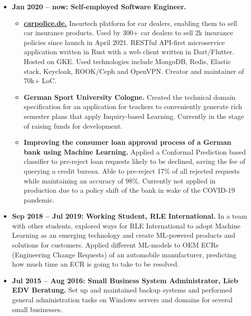 \documentclass[10pt]{article}
\begin{document}
\begin{itemize}[label={}, leftmargin=*]

\item \textbf{Jan 2020 -- now: Self-employed Software Engineer.}

  \begin{itemize}[label=\bullet, leftmargin=*]
    \item \textbf{\href{https://carpolice.de}{carpolice.de.}}
      Insurtech platform for car dealers, enabling them to sell
      car insurance products.
      Used by 300+ car dealers to sell 2k insurance policies since
      launch in April 2021.
      RESTful API-first microservice application written in Rust with
      a web client written in Dart/Flutter.
      Hosted on GKE.
      Used technologies include MongoDB, Redis, Elastic stack,
      Keycloak, ROOK/Ceph and OpenVPN.
      Creator and maintainer of 70k+ LoC.

    \item \textbf{German Sport University Cologne.}
      Created the technical domain specification for an
      application for teachers to conveniently generate rich semester
      plans that apply Inquiry-based Learning.
      Currently in the stage of raising funds for development.

    \item \textbf{Improving the consumer loan approval process of a
      German bank using Machine Learning.}
      Applied a Conformal Prediction based classifier to pre-reject
      loan requests likely to be declined, saving the fee of querying
      a credit bureau.
      Able to pre-reject 17\% of all rejected requests while
      maintaining an accuracy of 98\%.
      Currently not applied in production due to a policy shift of the
      bank in wake of the COVID-19 pandemic.
  \end{itemize}

\item \textbf{Sep 2018 -- Jul 2019: Working Student, RLE International.}
In a team with other students, explored ways for RLE
International to adopt Machine Learning as an emerging technology and
create ML-powered products and solutions for customers.
Applied different ML-models to OEM ECRs (Engineering Change Requests)
of an automobile manufacturer, predicting how much time an ECR is
going to take to be resolved.

\item \textbf{Jul 2015 -- Aug 2016: Small Business System Administrator,
Lieb EDV Beratung.}
Set up and maintained backup systems and performed general
administration tasks on Windows servers and domains for several small
businesses.

\end{itemize}
\end{document}
